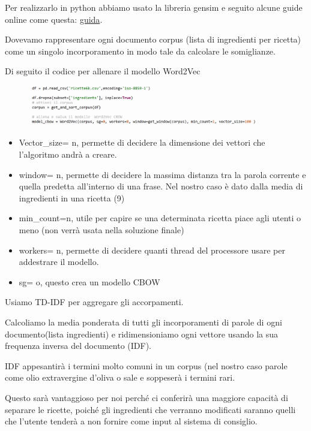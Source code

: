 \documentclass[12pt]{report}
\begin{document}
Per realizzarlo in python abbiamo usato la libreria gensim e seguito alcune guide online come questa: \href{http://nadbordrozd.github.io/blog/2016/05/20/text-classification-with-word2vec/}{guida}.

Dovevamo rappresentare ogni documento corpus (lista di ingredienti per ricetta) come un singolo incorporamento in modo tale da calcolare le somiglianze.

Di seguito il codice per allenare il modello Word2Vec

\begin{figure}[H]
        \centering
        {\includegraphics[width=0.9\textwidth]{img/img14.jpg}}
\end{figure}

\begin{itemize}
	\item Vector\_size= n, permette di decidere la dimensione dei vettori che l'algoritmo andrà a creare.
	\item window= n, permette di decidere la massima distanza tra la parola corrente e quella predetta all'interno di una frase. Nel nostro caso è dato dalla media di ingredienti in una ricetta (9)
	\item min\_count=n, utile per capire se una determinata ricetta piace agli utenti o meno (non verrà usata nella soluzione finale)
	\item workers= n, permette di decidere quanti thread del processore usare per addestrare il modello.
	\item sg= o, questo crea un modello CBOW
 \end{itemize}

Usiamo TD-IDF per aggregare gli accorpamenti.

Calcoliamo la media ponderata di tutti gli incorporamenti di parole di ogni documento(lista ingredienti) e ridimensioniamo ogni vettore usando la sua frequenza inversa del documento (IDF).

IDF appesantirà i termini molto comuni in un corpus (nel nostro caso parole come olio extravergine d'oliva o sale e soppeserà i termini rari.

Questo sarà vantaggioso per noi perché ci conferirà una maggiore capacità di separare le ricette, poiché gli ingredienti che verranno modificati saranno quelli che l'utente tenderà a non fornire come input al sistema di consiglio.
\end{document}
